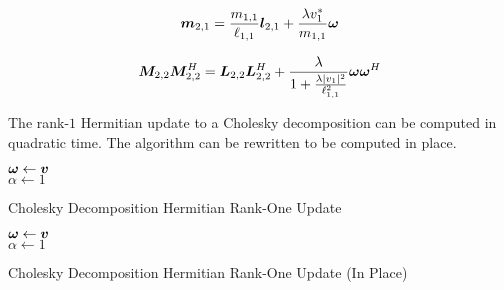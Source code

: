 \begin{appendices}
\begin{equation}
\bm{m}_{2,1} = \frac{m_{1,1}}{\ell_{1,1}} \bm{l}_{2,1} + \frac{\lambda v_1^{*}}{m_{1,1}}\bm{\omega}
\end{equation}

\begin{equation}
\bm{M}_{2,2}\bm{M}_{2,2}^H = \bm{L}_{2,2}\bm{L}_{2,2}^H + \frac{\lambda}{1 + \frac{\lambda |v_1|^2}{\ell_{1,1}^2}}\bm{\omega}\bm{\omega}^H
\end{equation}

The rank-$1$ Hermitian update to a Cholesky decomposition can be computed in quadratic time. The algorithm can be rewritten to be computed in place.

\begin{algorithm}[H]
\SetAlgoLined
   $\bm{\omega} \leftarrow \bm{v}$ \\
   $\alpha \leftarrow 1$ \\
 \caption{Cholesky Decomposition Hermitian Rank-One Update}
\end{algorithm} 




\begin{algorithm}[H]
\SetAlgoLined
   $\bm{\omega} \leftarrow \bm{v}$ \\
   $\alpha \leftarrow 1$ \\
 \caption{Cholesky Decomposition Hermitian Rank-One Update (In Place)}
\end{algorithm} 



\end{appendices}
